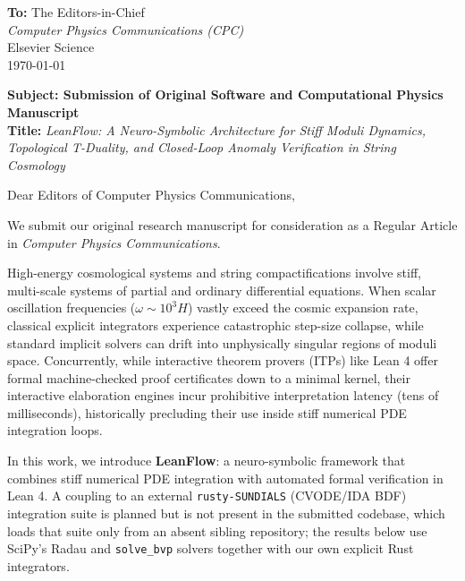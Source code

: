 \documentclass[11pt]{letter}
\begin{document}
\begin{flushleft}
\textbf{To:} The Editors-in-Chief \\
\textit{Computer Physics Communications (CPC)} \\
Elsevier Science \\
\today
\end{flushleft}

\vspace{1em}

\noindent\textbf{Subject: Submission of Original Software and Computational Physics Manuscript} \\
\textbf{Title:} \textit{LeanFlow: A Neuro-Symbolic Architecture for Stiff Moduli Dynamics, Topological T-Duality, and Closed-Loop Anomaly Verification in String Cosmology}

\vspace{1.5em}

\noindent Dear Editors of Computer Physics Communications,

We submit our original research manuscript for consideration as a Regular Article in \textit{Computer Physics Communications}.

High-energy cosmological systems and string compactifications involve stiff, multi-scale systems of partial and ordinary differential equations. When scalar oscillation frequencies ($\omega \sim 10^3 H$) vastly exceed the cosmic expansion rate, classical explicit integrators experience catastrophic step-size collapse, while standard implicit solvers can drift into unphysically singular regions of moduli space. Concurrently, while interactive theorem provers (ITPs) like Lean 4 offer formal machine-checked proof certificates down to a minimal kernel, their interactive elaboration engines incur prohibitive interpretation latency (tens of milliseconds), historically precluding their use inside stiff numerical PDE integration loops.

In this work, we introduce \textbf{LeanFlow}: a neuro-symbolic framework that combines stiff numerical PDE integration with automated formal verification in Lean 4. A coupling to an external \texttt{rusty-SUNDIALS} (CVODE/IDA BDF) integration suite is planned but is not present in the submitted codebase, which loads that suite only from an absent sibling repository; the results below use SciPy's Radau and \texttt{solve\_bvp} solvers together with our own explicit Rust integrators.
\end{document}
